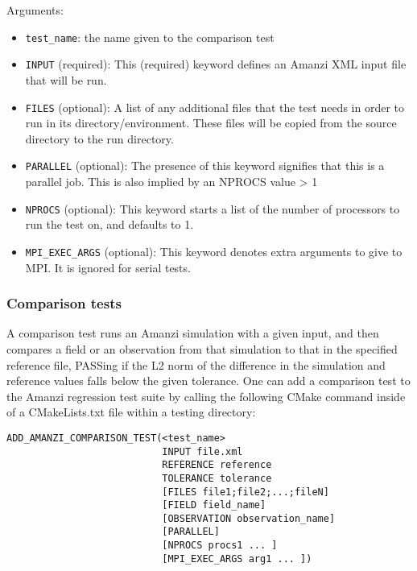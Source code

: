 Arguments:
\begin{itemize}
\item \verb|test_name|: the name given to the comparison test 
\item \verb|INPUT| (required): This (required) keyword defines an Amanzi XML input file that will 
      be run.
\item \verb|FILES| (optional): A list of any additional files that the test needs in order 
      to run in its directory/environment. These files will be copied from the source 
      directory to the run directory.
\item \verb|PARALLEL| (optional): The presence of this keyword signifies that this is 
      a parallel job. This is also implied by an NPROCS value > 1
\item \verb|NPROCS| (optional): This keyword starts a list of the number of processors to
      run the test on, and defaults to 1.
\item \verb|MPI_EXEC_ARGS| (optional): This keyword denotes extra arguments to give to
      MPI. It is ignored for serial tests.
\end{itemize}

\subsubsection{Comparison tests}

A comparison test runs an Amanzi simulation with a given input, and then compares 
a field or an observation from that simulation to that in the specified reference 
file, PASSing if the L2 norm of the difference in the simulation and reference 
values falls below the given tolerance. One can add a comparison test to the 
Amanzi regression test suite by calling the following CMake command inside of a 
CMakeLists.txt file within a testing directory:

\begin{verbatim}
ADD_AMANZI_COMPARISON_TEST(<test_name> 
                           INPUT file.xml
                           REFERENCE reference
                           TOLERANCE tolerance
                           [FILES file1;file2;...;fileN]
                           [FIELD field_name]
                           [OBSERVATION observation_name]
                           [PARALLEL] 
                           [NPROCS procs1 ... ]
                           [MPI_EXEC_ARGS arg1 ... ])
\end{verbatim}

